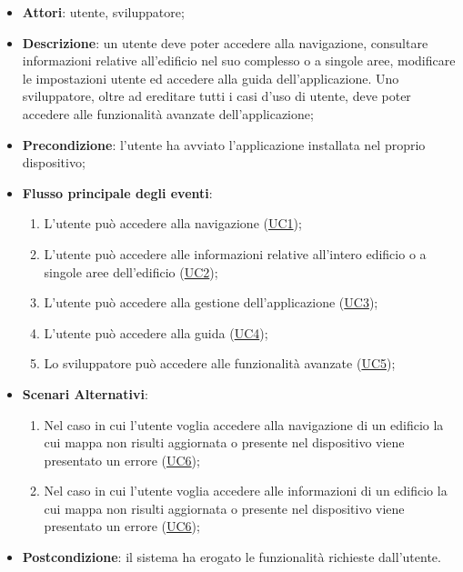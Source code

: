 \documentclass[../AnalisiDeiRequisiti.tex]{subfiles}
\begin{document}
\begin{itemize}
\item \textbf{Attori}: utente, sviluppatore;
\item \textbf{Descrizione}: un utente deve poter accedere alla navigazione, consultare informazioni relative all'edificio nel suo complesso o a singole aree, modificare le impostazioni utente ed accedere alla guida dell'applicazione. Uno sviluppatore, oltre ad ereditare tutti i casi d'uso di utente, deve poter accedere alle funzionalità avanzate dell'applicazione; 
      \item \textbf{Precondizione}: l'utente ha avviato l'applicazione installata nel proprio dispositivo;

        \item \textbf{Flusso principale degli eventi}:
          \begin{enumerate}
          \item L'utente può accedere alla navigazione (\hyperlink{UC1}{UC1});
          \item L'utente può accedere alle informazioni relative all'intero edificio o a singole aree dell'edificio (\hyperlink{UC2}{UC2});
          \item L'utente può accedere alla gestione dell'applicazione (\hyperlink{UC3}{UC3});
          \item L'utente può accedere alla guida (\hyperlink{UC4}{UC4});
          \item Lo sviluppatore può accedere alle funzionalità avanzate (\hyperlink{UC5}{UC5});

      \end{enumerate}
    \item \textbf{Scenari Alternativi}:
      \begin{enumerate}
          \item Nel caso in cui l'utente voglia accedere alla navigazione di un edificio la cui mappa non risulti aggiornata o presente nel dispositivo viene presentato un errore (\hyperlink{UC6}{UC6});
          \item Nel caso in cui l'utente voglia accedere alle informazioni di un edificio la cui mappa non risulti aggiornata o presente nel dispositivo viene presentato un errore (\hyperlink{UC6}{UC6});

      \end{enumerate}
    \item \textbf{Postcondizione}: il sistema ha erogato le funzionalità richieste dall'utente.
  \end{itemize}
\hypertarget{UC1}{}
\end{document}
